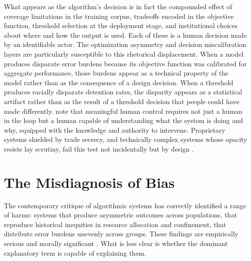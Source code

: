 \documentclass[12pt, a4paper]{article}
\begin{document}
What appears as the algorithm's decision is in fact the compounded effect of coverage limitations in the training corpus, tradeoffs encoded in the objective function, threshold selection at the deployment stage, and institutional choices about where and how the output is used. Each of these is a human decision made by an identifiable actor. The optimization asymmetry and decision miscalibration layers are particularly susceptible to this rhetorical displacement. When a model produces disparate error burdens because its objective function was calibrated for aggregate performance, those burdens appear as a technical property of the model rather than as the consequence of a design decision. When a threshold produces racially disparate detention rates, the disparity appears as a statistical artifact rather than as the result of a threshold decision that people could have made differently. \citet{santoni2018} note that meaningful human control requires not just a human in the loop but a human capable of understanding what the system is doing and why, equipped with the knowledge and authority to intervene. Proprietary systems shielded by trade secrecy, and technically complex systems whose opacity resists lay scrutiny, fail this test not incidentally but by design \citep{adalovace2021}.

\section{The Misdiagnosis of Bias}

The contemporary critique of algorithmic systems has correctly identified a range of harms: systems that produce asymmetric outcomes across populations, that reproduce historical inequities in resource allocation and confinement, that distribute error burdens unevenly across groups. These findings are empirically serious and morally significant \citep{bellanova2021, barocas2016}. What is less clear is whether the dominant explanatory term is capable of explaining them.
\end{document}
